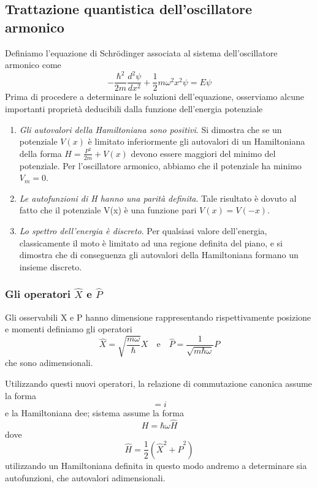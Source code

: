  \subsection{Trattazione quantistica dell'oscillatore armonico}
 Definiamo l'equazione di Schr\"odinger associata al sistema dell'oscillatore armonico come 
 \begin{equation}
 	-\frac{\hbar^2}{2m}\frac{d^2\psi}{dx^2} + \frac{1}{2}m \omega^2x^2\psi = E \psi
 \end{equation}
Prima di procedere a determinare le soluzioni dell'equazione, osserviamo alcune importanti propriet\`a deducibili dalla funzione dell'energia potenziale
\begin{enumerate}
	\item \textit{Gli autovalori della Hamiltoniana sono positivi}. Si dimostra che se un potenziale $V(x)$ \`e limitato inferiormente gli autovalori di un Hamiltoniana della forma $H = \frac{P^2}{2m} + V(x)$ devono essere maggiori del minimo del potenziale. Per l'oscillatore armonico, abbiamo che il potenziale ha minimo $V_m = 0$.
	\item \textit{Le autofunzioni di H hanno una parit\`a definita}. Tale risultato \`e dovuto al fatto che il potenziale V(x) \`e una funzione pari $V(x) = V(-x)$.
	\item \textit{Lo spettro dell'energia \`e discreto}. Per qualsiasi valore dell'energia, classicamente il moto \`e limitato ad una regione definita del piano, e si dimostra che di conseguenza gli autovalori della Hamiltoniana formano un insieme discreto. 
\end{enumerate}

\subsubsection{ Gli operatori $\hat{X}$ e $\hat{P}$}

Gli osservabili X e P hanno dimensione rappresentando rispettivamente posizione e momenti definiamo gli operatori
\begin{equation*}
	\hat{X} = \sqrt{\frac{m\omega}{\hbar}}X \quad \text{e} \quad \hat{P} = \frac{1}{\sqrt{m\hbar\omega}}P
\end{equation*}
che sono adimensionali.

Utilizzando questi nuovi operatori, la relazione di commutazione canonica assume la forma 
\begin{equation*}
	[\hat{X},\hat{P}] = i
\end{equation*}
e la Hamiltoniana dee; sistema assume la forma 
\begin{equation*}
	H = \hbar \omega \hat{H}
\end{equation*}
dove 
\begin{equation}
	\hat{H} = \frac{1}{2}(\hat{X}^2 + \hat{P}^2)
\end{equation}
utilizzando un Hamiltoniana definita in questo modo andremo a determinare sia autofunzioni, che autovalori adimensionali.

